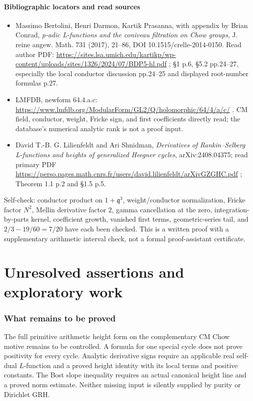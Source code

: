 \documentclass[11pt,a4paper]{article}
\providecommand{\tightlist}{\setlength{\itemsep}{0pt}\setlength{\parskip}{0pt}}
\begin{document}
\subsection{Bibliographic locators and read
sources}\label{bibliographic-locators-and-read-sources}

\begin{itemize}
\tightlist
\item
  Massimo Bertolini, Henri Darmon, Kartik Prasanna, with appendix by
  Brian Conrad, \emph{p-adic L-functions and the coniveau filtration on
  Chow groups}, J. reine angew. Math. 731 (2017), 21--86, DOI
  10.1515/crelle-2014-0150. Read author PDF:
  \url{https://sites.lsa.umich.edu/kartikp/wp-content/uploads/sites/1326/2024/07/BDP5-hl.pdf}
  ; §1 p.6, §5.2 pp.24--27, especially the local conductor discussion
  pp.24--25 and displayed root-number formulas p.27.
\item
  LMFDB, newform 64.4.a.c:
  \url{https://www.lmfdb.org/ModularForm/GL2/Q/holomorphic/64/4/a/c/} . CM
  field, conductor, weight, Fricke sign, and first coefficients directly
  read; the database's numerical analytic rank is not a proof input.
\item
  David T.-B. G. Lilienfeldt and Ari Shnidman, \emph{Derivatives of
  Rankin--Selberg L-functions and heights of generalized Heegner
  cycles}, arXiv:2408.04375; read primary PDF
  \url{https://perso.pages.math.cnrs.fr/users/david.lilienfeldt/arXivGZGHC.pdf}
  ; Theorem 1.1 p.2 and §1.5 p.5.
\end{itemize}

Self-check: conductor product on \(1+\mathfrak q^3\), weight/conductor
normalization, Fricke factor \(N^2\), Mellin derivative factor \(2\),
gamma cancellation at the zero, integration-by-parts kernel, coefficient
growth, vanished first terms, geometric-series tail, and
\(2/3-19/60=7/20\) have each been checked. This is a written proof with
a supplementary arithmetic interval check, not a formal proof-assistant
certificate.
\part{Unresolved assertions and exploratory work}
\section{What remains to be proved}
The full primitive arithmetic height form on the complementary CM Chow
motive remains to be controlled. A formula for one special cycle does
not prove positivity for every cycle. Analytic derivative signs require
an applicable real self-dual $L$-function and a proved height identity
with its local terms and positive constants. The Bost slope inequality
requires an actual canonical height line and a proved norm estimate.
Neither missing input is silently supplied by purity or Dirichlet GRH.
\end{document}
